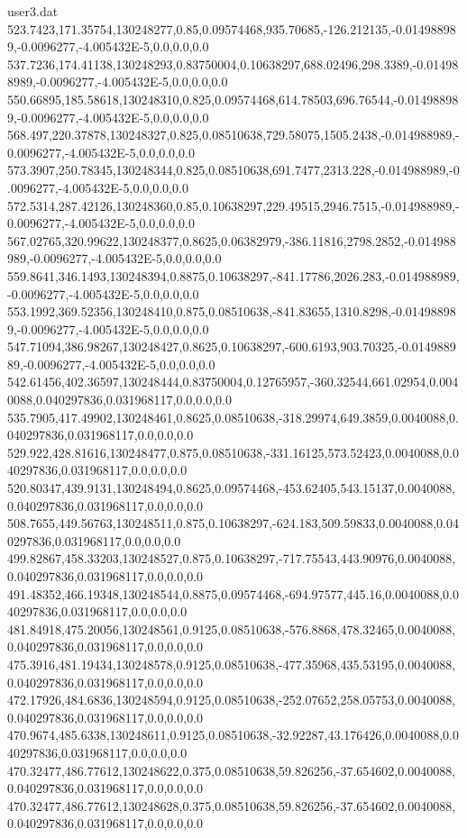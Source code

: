 \begin{filecontents}{user3.dat}
523.7423,171.35754,130248277,0.85,0.09574468,935.70685,-126.212135,-0.014988989,-0.0096277,-4.005432E-5,0.0,0.0,0.0
537.7236,174.41138,130248293,0.83750004,0.10638297,688.02496,298.3389,-0.014988989,-0.0096277,-4.005432E-5,0.0,0.0,0.0
550.66895,185.58618,130248310,0.825,0.09574468,614.78503,696.76544,-0.014988989,-0.0096277,-4.005432E-5,0.0,0.0,0.0
568.497,220.37878,130248327,0.825,0.08510638,729.58075,1505.2438,-0.014988989,-0.0096277,-4.005432E-5,0.0,0.0,0.0
573.3907,250.78345,130248344,0.825,0.08510638,691.7477,2313.228,-0.014988989,-0.0096277,-4.005432E-5,0.0,0.0,0.0
572.5314,287.42126,130248360,0.85,0.10638297,229.49515,2946.7515,-0.014988989,-0.0096277,-4.005432E-5,0.0,0.0,0.0
567.02765,320.99622,130248377,0.8625,0.06382979,-386.11816,2798.2852,-0.014988989,-0.0096277,-4.005432E-5,0.0,0.0,0.0
559.8641,346.1493,130248394,0.8875,0.10638297,-841.17786,2026.283,-0.014988989,-0.0096277,-4.005432E-5,0.0,0.0,0.0
553.1992,369.52356,130248410,0.875,0.08510638,-841.83655,1310.8298,-0.014988989,-0.0096277,-4.005432E-5,0.0,0.0,0.0
547.71094,386.98267,130248427,0.8625,0.10638297,-600.6193,903.70325,-0.014988989,-0.0096277,-4.005432E-5,0.0,0.0,0.0
542.61456,402.36597,130248444,0.83750004,0.12765957,-360.32544,661.02954,0.0040088,0.040297836,0.031968117,0.0,0.0,0.0
535.7905,417.49902,130248461,0.8625,0.08510638,-318.29974,649.3859,0.0040088,0.040297836,0.031968117,0.0,0.0,0.0
529.922,428.81616,130248477,0.875,0.08510638,-331.16125,573.52423,0.0040088,0.040297836,0.031968117,0.0,0.0,0.0
520.80347,439.9131,130248494,0.8625,0.09574468,-453.62405,543.15137,0.0040088,0.040297836,0.031968117,0.0,0.0,0.0
508.7655,449.56763,130248511,0.875,0.10638297,-624.183,509.59833,0.0040088,0.040297836,0.031968117,0.0,0.0,0.0
499.82867,458.33203,130248527,0.875,0.10638297,-717.75543,443.90976,0.0040088,0.040297836,0.031968117,0.0,0.0,0.0
491.48352,466.19348,130248544,0.8875,0.09574468,-694.97577,445.16,0.0040088,0.040297836,0.031968117,0.0,0.0,0.0
481.84918,475.20056,130248561,0.9125,0.08510638,-576.8868,478.32465,0.0040088,0.040297836,0.031968117,0.0,0.0,0.0
475.3916,481.19434,130248578,0.9125,0.08510638,-477.35968,435.53195,0.0040088,0.040297836,0.031968117,0.0,0.0,0.0
472.17926,484.6836,130248594,0.9125,0.08510638,-252.07652,258.05753,0.0040088,0.040297836,0.031968117,0.0,0.0,0.0
470.9674,485.6338,130248611,0.9125,0.08510638,-32.92287,43.176426,0.0040088,0.040297836,0.031968117,0.0,0.0,0.0
470.32477,486.77612,130248622,0.375,0.08510638,59.826256,-37.654602,0.0040088,0.040297836,0.031968117,0.0,0.0,0.0
470.32477,486.77612,130248628,0.375,0.08510638,59.826256,-37.654602,0.0040088,0.040297836,0.031968117,0.0,0.0,0.0

\end{filecontents}
